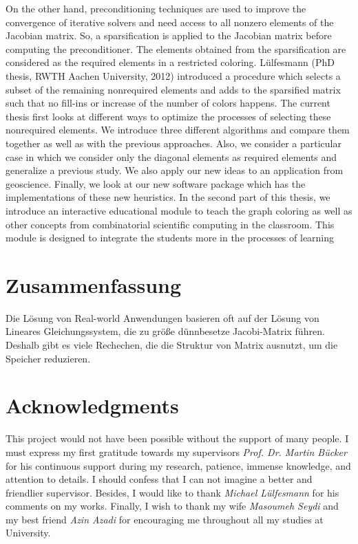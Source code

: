 \documentclass[12pt, twoside,a4paper,toc=bibliography]{scrbook}
\begin{document}
On the other hand, preconditioning techniques are used to
improve the convergence of iterative solvers and need access to all nonzero elements
of the Jacobian matrix.
So, a sparsification is applied to the Jacobian matrix before computing the preconditioner.
The elements obtained from the sparsification are considered as the required elements in a restricted coloring.
Lülfesmann (PhD thesis, RWTH Aachen University, 2012) introduced a procedure
which selects a subset of the remaining nonrequired elements and adds to the sparsified matrix
such that no fill-ins or increase of the number of colors happens.
The current thesis first looks at different ways to optimize the processes of selecting these nonrequired elements.
We introduce three different algorithms and compare them together as well as with the previous approaches.
Also, we consider a particular case in which we consider only the diagonal elements as required elements
and generalize a previous study. We also apply our new ideas to an application from geoscience.
Finally, we look at our new software package which has the implementations of these new heuristics.
In the second part of this thesis, we introduce an interactive educational module to teach the
graph coloring as well as other concepts from combinatorial scientific computing in the classroom.
This module is designed to integrate the students more in the processes of learning

\chapter*{Zusammenfassung}
Die Lösung von Real-world Anwendungen basieren oft auf der Lösung von Lineares Gleichungssystem,
die zu größe dünnbesetze Jacobi-Matrix führen. Deshalb gibt es viele Rechechen, die 
die Struktur von Matrix ausnutzt, um die Speicher reduzieren.


\chapter*{Acknowledgments}
\noindent This project would not have been possible without
the support of many people. I must express my first gratitude
towards my supervisors \textit{Prof. Dr. Martin B\"ucker} for his continuous
support during my research, patience, immense knowledge,
and attention to details.
I should confess that I can not imagine a better and friendlier supervisor.
Besides, I would like to thank \textit{Michael Lülfesmann} for his comments on my works.
Finally, I wish to thank my wife \textit{Masoumeh Seydi} and
my best friend \textit{Azin Azadi} for encouraging me throughout all my studies at University.
\end{document}
